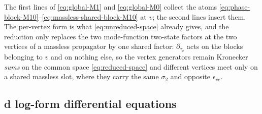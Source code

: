 \documentclass[11pt,a4paper]{article}
\begin{document}
The first lines of \eqref{eq:global-M1} and \eqref{eq:global-M0} collect the atoms
\eqref{eq:phase-block-M10}--\eqref{eq:massless-shared-block-M10} at $v$; the second lines insert them.
The per-vertex form is what \eqref{eq:unreduced-space} already gives, and the reduction only
replaces the two mode-function two-state factors at the two vertices of a massless propagator by one shared factor:
$\partial_{\tau_v}$ acts
on the blocks belonging to $v$ and on nothing else, so the vertex generators remain Kronecker
\emph{sums} on the common space \eqref{eq:reduced-space} and different vertices meet only on a
shared massless slot, where they carry the same $\sigma_2$ and opposite $\epsilon_{ve}$.

\subsection{d log-form differential equations}
\label{sec:dlog}
\end{document}
